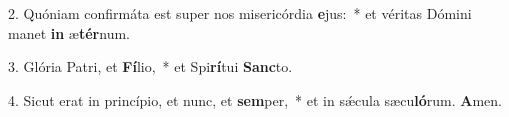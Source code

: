 2. Quóniam confirmáta est super nos misericórdia \textbf{e}jus:~*  et véritas Dómini manet \textbf{in} æ\textbf{tér}num.\

3. Glória Patri, et \textbf{Fí}lio,~*  et Spi\textbf{rí}tui \textbf{Sanc}to.\

4. Sicut erat in princípio, et nunc, et \textbf{sem}per,~*  et in sǽcula sæcu\textbf{ló}rum. \textbf{A}men.\

